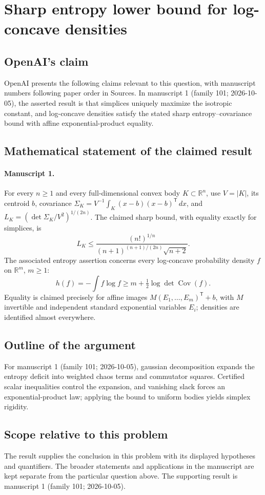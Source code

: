 \documentclass[11pt]{article}
\begin{document}
\section*{Sharp entropy lower bound for log-concave densities}

\subsection{OpenAI's claim}
OpenAI presents the following claims relevant to this question, with manuscript numbers following paper order in Sources. In manuscript 1 (family 101; 2026-10-05), the asserted result is that simplices uniquely maximize the isotropic constant, and log-concave densities satisfy the stated sharp entropy--covariance bound with affine exponential-product equality.

\subsection{Mathematical statement of the claimed result}
\paragraph{Manuscript 1.}
For every $n\ge1$ and every full-dimensional convex body $K\subset\mathbb R^n$, use $V=|K|$, its centroid $b$, covariance $\Sigma_K=V^{-1}\int_K(x-b)(x-b)^{\mathsf T}\,dx$, and $L_K=(\det\Sigma_K/V^2)^{1/(2n)}$. The claimed sharp bound, with equality exactly for simplices, is
\[
 L_K\le\frac{(n!)^{1/n}}{(n+1)^{(n+1)/(2n)}\sqrt{n+2}}.
\]
The associated entropy assertion concerns every log-concave probability density $f$ on $\mathbb R^m$, $m\ge1$:
\[
 h(f)=-\int f\log f\ge m+\tfrac12\log\det\operatorname{Cov}(f).
\]
Equality is claimed precisely for affine images $M(E_1,\ldots,E_m)^{\mathsf T}+b$, with $M$ invertible and independent standard exponential variables $E_i$; densities are identified almost everywhere.

\subsection{Outline of the argument}
For manuscript 1 (family 101; 2026-10-05), gaussian decomposition expands the entropy deficit into weighted chaos terms and commutator squares. Certified scalar inequalities control the expansion, and vanishing slack forces an exponential-product law; applying the bound to uniform bodies yields simplex rigidity.

\subsection{Scope relative to this problem}
The result supplies the conclusion in this problem with its displayed hypotheses and quantifiers. The broader statements and applications in the manuscript are kept separate from the particular question above. The supporting result is manuscript 1 (family 101; 2026-10-05).
\end{document}
